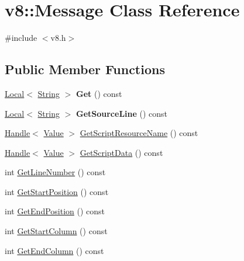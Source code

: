 \hypertarget{classv8_1_1_message}{}\section{v8\+:\+:Message Class Reference}
\label{classv8_1_1_message}


{\ttfamily \#include $<$v8.\+h$>$}

\subsection*{Public Member Functions}
\begin{DoxyCompactItemize}
\item 
\hypertarget{classv8_1_1_message_a72f26c7b684bbfbd14d5970849fdf3d2}{}\hyperlink{classv8_1_1_local}{Local}$<$ \hyperlink{classv8_1_1_string}{String} $>$ {\bfseries Get} () const \label{classv8_1_1_message_a72f26c7b684bbfbd14d5970849fdf3d2}

\item 
\hypertarget{classv8_1_1_message_a0d5cceb5128a147818c72b82950e475d}{}\hyperlink{classv8_1_1_local}{Local}$<$ \hyperlink{classv8_1_1_string}{String} $>$ {\bfseries Get\+Source\+Line} () const \label{classv8_1_1_message_a0d5cceb5128a147818c72b82950e475d}

\item 
\hyperlink{classv8_1_1_handle}{Handle}$<$ \hyperlink{classv8_1_1_value}{Value} $>$ \hyperlink{classv8_1_1_message_ac5d31afb758897cd1653c5eb3327a4d6}{Get\+Script\+Resource\+Name} () const 
\item 
\hyperlink{classv8_1_1_handle}{Handle}$<$ \hyperlink{classv8_1_1_value}{Value} $>$ \hyperlink{classv8_1_1_message_ace10c210ccbb542b1b75cadefbc4e899}{Get\+Script\+Data} () const 
\item 
int \hyperlink{classv8_1_1_message_a67f97fd76b8f98ed65743b9615d64a79}{Get\+Line\+Number} () const 
\item 
int \hyperlink{classv8_1_1_message_a31a550a1d3d09a2d72d0742be821956f}{Get\+Start\+Position} () const 
\item 
int \hyperlink{classv8_1_1_message_a50cbec87379e628b1647466926882037}{Get\+End\+Position} () const 
\item 
int \hyperlink{classv8_1_1_message_aab8007ba81d3f195280bce0693810cc2}{Get\+Start\+Column} () const 
\item 
int \hyperlink{classv8_1_1_message_aaf82cd7f7449add5f50d4253499cad05}{Get\+End\+Column} () const 
\end{DoxyCompactItemize}
